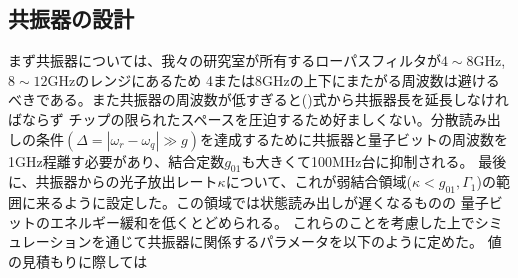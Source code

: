 \subsection{共振器の設計}
まず共振器については、我々の研究室が所有するローパスフィルタが$4 \sim 8$GHz,$8 \sim 12$GHzのレンジにあるため
4または8GHzの上下にまたがる周波数は避けるべきである。また共振器の周波数が低すぎると()式から共振器長を延長しなければならず
チップの限られたスペースを圧迫するため好ましくない。分散読み出しの条件$(\Delta = |\omega_r − \omega_q|\gg g)$を達成するために共振器と量子ビットの周波数を1GHz程離す必要があり、結合定数$g_{01}$も大きくて100MHz台に抑制される。
最後に、共振器からの光子放出レート$\kappa$について、これが弱結合領域($\kappa<g_{01},\Gamma_1$)の範囲に来るように設定した。この領域では状態読み出しが遅くなるものの
量子ビットのエネルギー緩和を低くとどめられる。
これらのことを考慮した上でシミュレーションを通じて共振器に関係するパラメータを以下のように定めた。
値の見積もりに際しては
